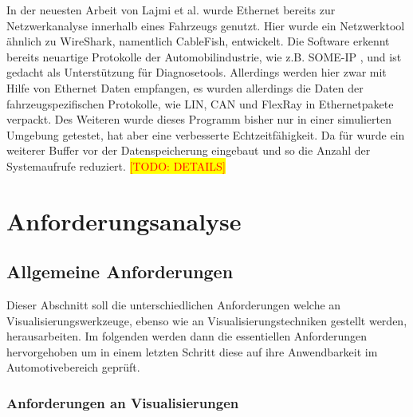 \documentclass[draft=false
              ,paper=a4
              ,twoside=false
              ,fontsize=11pt
              ,headsepline
              ,BCOR10mm
              ,DIV11
              ]{scrbook}
\newcommand{\TODO}[1]{\colorbox{yellow}{\textcolor{red}{[TODO: #1]}}}
\begin{document}
In der neuesten Arbeit von Lajmi et al. \cite{lajmi_using_2013} wurde Ethernet bereits zur Netzwerkanalyse innerhalb eines Fahrzeugs genutzt. Hier wurde ein Netzwerktool ähnlich zu WireShark, namentlich CableFish, entwickelt. Die Software erkennt bereits neuartige Protokolle der Automobilindustrie, wie z.B. SOME-IP \cite{someip_scalable_2014}, und ist gedacht als Unterstützung für Diagnosetools. Allerdings werden hier zwar mit Hilfe von Ethernet Daten empfangen, es wurden allerdings die Daten der fahrzeugspezifischen Protokolle, wie LIN, CAN und FlexRay in Ethernetpakete verpackt. Des Weiteren wurde dieses Programm bisher nur in einer simulierten Umgebung getestet, hat aber eine verbesserte Echtzeitfähigkeit. Da für wurde ein weiterer Buffer vor der Datenspeicherung eingebaut und so die Anzahl der Systemaufrufe reduziert. \TODO{DETAILS}\fi

\chapter{Anforderungsanalyse} %
\label{cha:anforderungsanalyse}

\section{Allgemeine Anforderungen} %
\label{sec:allgemeine_anforderungen}

Dieser Abschnitt soll die unterschiedlichen Anforderungen welche an Visualisierungswerkzeuge, ebenso wie an Visualisierungstechniken gestellt werden, herausarbeiten. Im folgenden werden dann die essentiellen Anforderungen hervorgehoben um in einem letzten Schritt diese auf ihre Anwendbarkeit im Automotivebereich geprüft.


\subsection{Anforderungen an Visualisierungen} %
\label{sub:anforderungen_an_visualisierungen}
\end{document}
